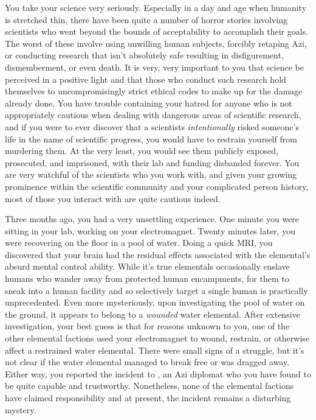\documentclass[char]{elementals}
\begin{document}
You take your science very seriously. Especially in a day and age when humanity is stretched thin, there have been quite a number of horror stories involving scientists who went beyond the bounds of acceptability to accomplish their goals. The worst of these involve using unwilling human subjects, forcibly retaping Azi, or conducting research that isn't absolutely safe resulting in disfigurement, dismemberment, or even death. It is very, very important to you that science be perceived in a positive light and that those who conduct such research hold themselves to uncompromisingly strict ethical codes to make up for the damage already done. You have trouble containing your hatred for anyone who is not appropriately cautious when dealing with dangerous areas of scientific research, and if you were to ever discover that a scientists \emph{intentionally} risked someone's life in the name of scientific progress, you would have to restrain yourself from murdering them. At the very least, you would see them publicly exposed, prosecuted, and imprisoned, with their lab and funding disbanded forever. You are very watchful of the scientists who you work with, and given your growing prominence within the scientific community and your complicated person history, most of those you interact with are quite cautious indeed.


Three months ago, you had a very unsettling experience. One minute you were sitting in your lab, working on your electromagnet. Twenty minutes later, you were recovering on the floor in a pool of water. Doing a quick MRI, you discovered that your brain had the residual effects associated with the elemental's absurd mental control ability. While it's true elementals occasionally enslave humans who wander away from protected human encampments, for them to sneak into a human facility and so selectively target a single human is practically unprecedented. Even more mysteriously, upon investigating the pool of water on the ground, it appears to belong to a \emph{wounded} water elemental. After extensive investigation, your best guess is that for reasons unknown to you, one of the other elemental factions used your electromagnet to wound, restrain, or otherwise affect a restrained water elemental. There were small signs of a struggle, but it's not clear if the water elemental managed to break free or was dragged away. Either way, you reported the incident to \cDiplomat{\intro}, an Azi diplomat who you have found to be quite capable and trustworthy. Nonetheless, none of the elemental factions have claimed responsibility and at present, the incident remains a disturbing mystery.
\end{document}
